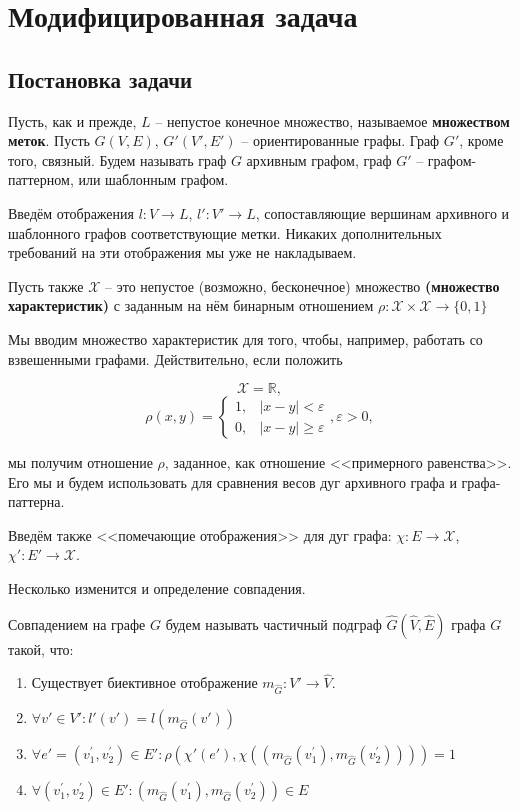 \section{Модифицированная задача}

\subsection{Постановка задачи}
\par Пусть, как и прежде, $L$ -- непустое конечное множество, называемое \textbf{множеством меток}. Пусть $G(V, E)$, $G'(V', E')$ -- ориентированные графы. Граф $G'$, кроме того, связный. Будем называть граф $G$ архивным графом, граф $G'$ -- графом-паттерном, или шаблонным графом.

Введём отображения $l : V \to L$, $l' : V' \to L$, сопоставляющие вершинам архивного и шаблонного графов соответствующие метки. Никаких дополнительных требований на эти отображения мы уже не накладываем.

Пусть также $\mathcal{X}$ -- это непустое (возможно, бесконечное) множество \textbf{(множество характеристик)} с заданным на нём бинарным отношением $\rho:\mathcal{X} \times \mathcal{X} \to \{0, 1\}$

Мы вводим множество характеристик для того, чтобы, например, работать со взвешенными графами. Действительно, если положить 

\[\mathcal{X} = \mathbb{R},\]
\[\rho(x, y) = \begin{cases}
1, & |x - y| < \varepsilon \\
0, & |x - y| \ge \varepsilon
\end{cases}, \varepsilon > 0,\]

мы получим отношение $\rho$, заданное, как отношение <<примерного равенства>>. Его мы и будем использовать для сравнения весов дуг архивного графа и графа-паттерна.

Введём также <<помечающие отображения>> для дуг графа: $\chi : E \to \mathcal{X}$, $\chi' : E' \to \mathcal{X}$.

Несколько изменится и определение совпадения.

\begin{defn}
	Совпадением на графе $G$ будем называть частичный подграф $\widehat{G}(\widehat{V}, \widehat{E})$ графа $G$ такой, что:
	\begin{enumerate}
		\item Существует биективное отображение $m_{\widehat{G}}: V' \to \widehat{V}$.
		\item $\forall v' \in V': l'(v') = l(m_{\widehat{G}}(v'))$
		\item $\forall e' = (v^{\prime}_1, v^{\prime}_2) \in E': \rho(\chi'(e'), \chi((m_{\widehat{G}}(v^{\prime}_1), m_{\widehat{G}}(v^{\prime}_2)))) = 1$
		\item $\forall (v^{\prime}_1, v^{\prime}_2) \in E': (m_{\widehat{G}}(v^{\prime}_1), m_{\widehat{G}}(v^{\prime}_2)) \in E$
	\end{enumerate}
\end{defn} 


